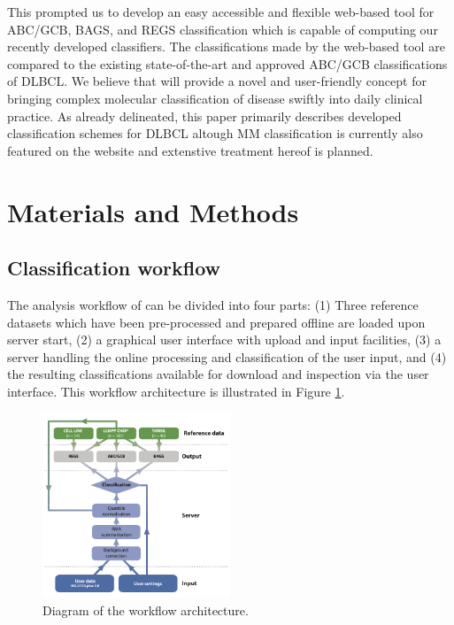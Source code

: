 \documentclass{article}
\begin{document}
This prompted us to develop an easy accessible and flexible web-based tool for ABC/GCB, BAGS, and REGS classification which is capable of computing our recently developed classifiers.
The classifications made by the web-based tool \hemaClass{} are compared to the existing state-of-the-art and approved ABC/GCB classifications of DLBCL.
We believe that \hemaClass{} will provide a novel and user-friendly concept for bringing complex molecular classification of disease swiftly into daily clinical practice.
As already delineated, this paper primarily describes developed classification schemes for DLBCL altough MM classification is currently also featured on the website and extenstive treatment hereof is planned.

\section{Materials and Methods}

\subsection{Classification workflow}
The analysis workflow of \hemaClass{} can be divided into four parts:
(1) Three reference datasets which have been pre-processed and prepared offline are loaded upon server start,
(2) a graphical user interface with upload and input facilities,
(3) a server handling the online processing and classification of the user input, and
(4) the resulting classifications available for download and inspection via the user interface.
This workflow architecture is illustrated in Figure \ref{fig:webtooldiagram}.

\begin{figure}
\begin{center}
\includegraphics[width=0.5\textwidth]{figures/Flowchart6.pdf}
\end{center}
\caption{Diagram of the workflow architecture.}
\label{fig:webtooldiagram}
\end{figure}
\end{document}
